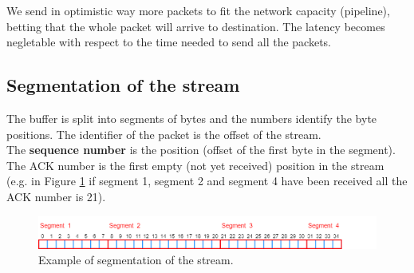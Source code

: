 We send in optimistic way more packets to fit the network capacity (pipeline), betting that the whole packet will arrive to destination. The latency becomes negletable with respect to the time needed to send all the packets.

\subsection{Segmentation of the stream}
The buffer is split into segments of bytes and the numbers identify the byte positions. The identifier of the packet is the offset of the stream.\\
The \textbf{sequence number} is the position (offset of the first byte in the segment). The ACK number is the first empty (not yet received) position in the stream (e.g. in Figure \ref{segmentation} if segment 1, segment 2 and segment 4 have been received all the ACK number is 21).\\

\begin{figure}[H]
\centering\footnotesize
\includegraphics[scale=0.5]{Images/Transport/segmentation}
\caption{Example of segmentation of the stream.}\label{segmentation}
\end{figure}

